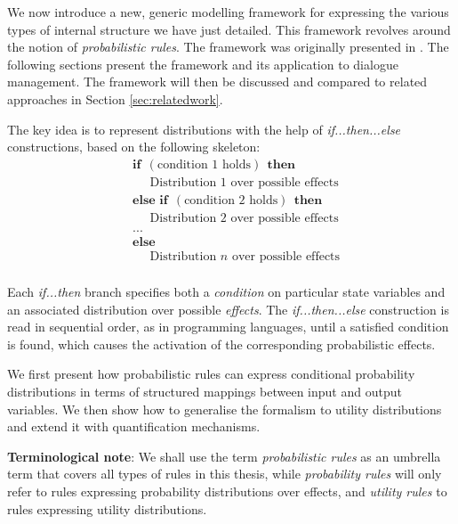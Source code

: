 We now introduce a new, generic modelling framework for expressing the various types of internal structure we have just detailed.  This framework revolves around the notion of \textit{probabilistic rules}. The framework was originally presented in \cite{rulebasedmodels-sigdial2012,lison-semdial2012}. The following sections present the framework and its application to dialogue management.  The framework will then be discussed and compared to related approaches in Section \ref{sec:relatedwork}.

The key idea is to represent distributions with the help of \textit{if...then...else} constructions, based on the following skeleton:
\begin{equation*}
\begin{aligned}
& \textbf{if} \ \ (\text{condition 1 holds}) \ \ \textbf{then} \\ 
& \;\;\;\;\; \text{Distribution 1 over possible effects} \\
& \textbf{else if} \ \ (\text{condition 2 holds}) \ \ \textbf{then} \\ 
& \;\;\;\;\; \text{Distribution 2 over possible effects} \\
& ... \\
& \textbf{else} \\
& \;\;\;\;\; \text{Distribution } n \text{ over possible effects} \\ 
\end{aligned}
\end{equation*}

Each \textit{if...then} branch specifies both a \textit{condition} on particular state variables and an associated distribution over possible \textit{effects}.   The \textit{if...then...else} construction is read in sequential order, as in programming languages, until a satisfied condition is found, which causes the activation of the corresponding probabilistic effects. 

We first present how probabilistic rules can express conditional probability distributions in terms of structured mappings between input and output variables.  We then show how to  generalise the formalism to utility distributions and extend it with quantification mechanisms.

\textbf{Terminological note}: We shall use the term \textit{probabilistic rules} as an umbrella term that covers all types of rules in this thesis, while \textit{probability rules} will only refer to rules expressing probability distributions over effects, and \textit{utility rules} to rules expressing utility distributions.

